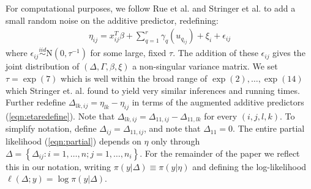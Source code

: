 \documentclass[serif,10pt]{wiley-article}
\begin{document}
For computational purposes, we follow Rue et al. \cite{inla} and Stringer et al. \cite{casecross} to add a small random noise on the additive predictor, redefining: 
\begin{equation}\begin{aligned}\label{eqn:etaredefine}
\eta_{ij} =x_{ij}^{T}\beta+\sum_{q=1}^{r} \gamma_q(u_{q_{ij}}) +\xi_{i} + \epsilon_{ij}
\end{aligned}\end{equation}
where $\epsilon_{ij} \stackrel{iid}{\sim} \text{N}(0,\tau^{-1})$ for some large, fixed $\tau$. The addition of these $\epsilon_{ij}$ gives the joint distribution of $\left(\Delta, \Gamma,\beta, \xi \right)$ a non-singular variance matrix. We set $\tau = \exp(7)$ which is well within the broad range of $\exp(2),\ldots,\exp(14)$ which Stringer et. al. \cite{casecross} found to yield very similar inferences and running times. Further redefine $\Delta_{lk,ij} = \eta_{lk} - \eta_{ij}$ in terms of the augmented additive predictors (\ref{eqn:etaredefine}). Note that $\Delta_{lk,ij} = \Delta_{11,ij} - \Delta_{11,lk}$ for every $(i,j,l,k)$. To simplify notation, define $\Delta_{ij} = \Delta_{11,ij}$, and note that $\Delta_{11} = 0$. The entire partial likelihood (\ref{eqn:partial}) depends on $\eta$ only through  $\Delta = \left\{\Delta_{ij}: i = 1,\ldots,n; j = 1,\ldots,n_{i} \right\}$. For the remainder of the paper we reflect this in our notation, writing $\pi(y|\Delta) \equiv \pi(y|\eta)$ and defining the log-likelihood $\ell(\Delta; y) = \log\pi(y|\Delta)$.
\end{document}
